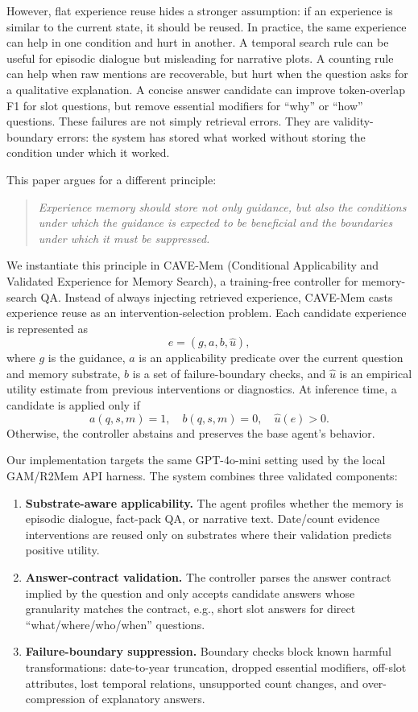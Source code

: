 \documentclass[11pt]{article}
\newcommand{\method}{CAVE-Mem}
\begin{document}
However, flat experience reuse hides a stronger assumption: if an experience is
similar to the current state, it should be reused. In practice, the same
experience can help in one condition and hurt in another. A temporal search
rule can be useful for episodic dialogue but misleading for narrative plots. A
counting rule can help when raw mentions are recoverable, but hurt when the
question asks for a qualitative explanation. A concise answer candidate can
improve token-overlap F1 for slot questions, but remove essential modifiers for
``why'' or ``how'' questions. These failures are not simply retrieval errors.
They are validity-boundary errors: the system has stored what worked without
storing the condition under which it worked.

This paper argues for a different principle:

\begin{quote}
\emph{Experience memory should store not only guidance, but also the
conditions under which the guidance is expected to be beneficial and the
boundaries under which it must be suppressed.}
\end{quote}

We instantiate this principle in \method{} (Conditional Applicability and
Validated Experience for Memory Search), a training-free controller for
memory-search QA. Instead of always injecting retrieved experience, \method{}
casts experience reuse as an intervention-selection problem. Each candidate
experience is represented as
\[
e = (g, a, b, \hat{u}),
\]
where $g$ is the guidance, $a$ is an applicability predicate over the current
question and memory substrate, $b$ is a set of failure-boundary checks, and
$\hat{u}$ is an empirical utility estimate from previous interventions or
diagnostics. At inference time, a candidate is applied only if
\[
a(q, s, m)=1,\quad b(q, s, m)=0,\quad \hat{u}(e)>0.
\]
Otherwise, the controller abstains and preserves the base agent's behavior.

Our implementation targets the same GPT-4o-mini setting used by the local
GAM/R2Mem API harness. The system combines three validated components:

\begin{enumerate}[leftmargin=*]
  \item \textbf{Substrate-aware applicability.} The agent profiles whether the
  memory is episodic dialogue, fact-pack QA, or narrative text. Date/count
  evidence interventions are reused only on substrates where their validation
  predicts positive utility.
  \item \textbf{Answer-contract validation.} The controller parses the answer
  contract implied by the question and only accepts candidate answers whose
  granularity matches the contract, e.g., short slot answers for direct
  ``what/where/who/when'' questions.
  \item \textbf{Failure-boundary suppression.} Boundary checks block known
  harmful transformations: date-to-year truncation, dropped essential
  modifiers, off-slot attributes, lost temporal relations, unsupported count
  changes, and over-compression of explanatory answers.
\end{enumerate}
\end{document}

